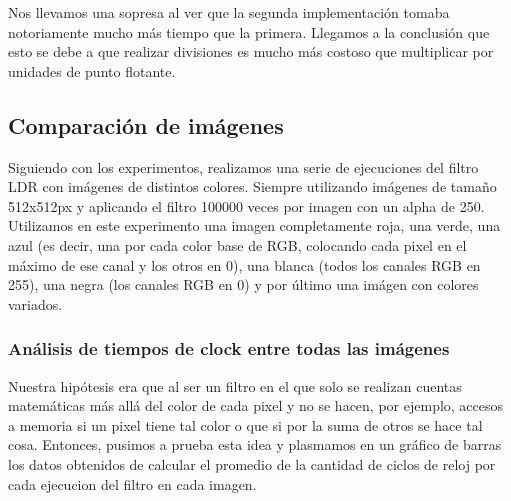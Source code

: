 \documentclass[a4paper]{article}
\begin{document}
\begin{figure}[!ht]
    \centering
    \begin{floatrow}
    \end{floatrow}
\end{figure}

Nos llevamos una sopresa al ver que la segunda implementación tomaba notoriamente mucho más tiempo que la primera. Llegamos a la conclusión que esto se debe
a que realizar divisiones es mucho más costoso que multiplicar por unidades de punto flotante.

\subsection{Comparación de imágenes}
Siguiendo con los experimentos, realizamos una serie de ejecuciones del filtro LDR con imágenes de distintos colores. Siempre utilizando imágenes de
tamaño 512x512px y aplicando el filtro 100000 veces por imagen con un alpha de 250. Utilizamos en este experimento una imagen completamente roja, una verde, una azul (es decir,
una por cada color base de RGB, colocando cada pixel en el máximo de ese canal y los otros en 0), una blanca (todos los canales RGB en 255), una negra
(los canales RGB en 0) y por último una imágen con colores variados.

\subsubsection{Análisis de tiempos de clock entre todas las imágenes}
Nuestra hipótesis era que al ser un filtro en el que solo se realizan cuentas matemáticas
más allá del color de cada pixel y no se hacen, por ejemplo, accesos a memoria si un pixel tiene tal color o que si por la suma de otros se hace tal cosa. Entonces,
pusimos a prueba esta idea y plasmamos en un gráfico de barras los datos obtenidos de calcular el promedio de la cantidad de ciclos de reloj por cada ejecucion del filtro
en cada imagen.
\end{document}
